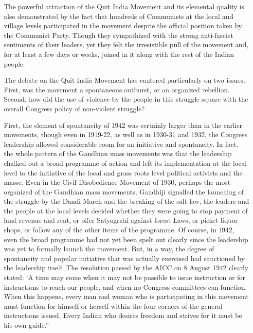 The powerful attraction of the Quit India Movement and its elemental quality is also demonstrated by the fact that hundreds of Communists at the local and village levels participated in the movement despite the official position taken by the Communist Party. Though they sympathized with the strong anti-fascist sentiments of their leaders, yet they felt the irresistible pull of the movement and, for at least a few days or weeks, joined in it along with the rest of the Indian people.

The debate on the Quit India Movement has cantered particularly on two issues. First, was the movement a spontaneous outburst, or an organized rebellion. Second, how did the use of violence by the people in this struggle square with the overall Congress policy of non-violent struggle?

First, the element of spontaneity of 1942 was certainly larger than in the earlier movements, though even in 1919-22, as well as in 1930-31 and 1932, the Congress leadership allowed considerable room for an initiative and spontaneity. In fact, the whole pattern of the Gandhian mass movements was that the leadership chalked out a broad programme of action and left its implementation at the local level to the initiative of the local and grass roots level political activists and the masse. Even in the Civil Disobedience Movement of 1930, perhaps the most organized of the Gandhian mass movements, Gandhiji signalled the launching of the struggle by the Dandi March and the breaking of the salt law, the leaders and the people at the local levels decided whether they were going to stop payment of land revenue and rent, or offer Satyagrahi against forest Laws, or picket liquor shops, or follow any of the other items of the programme. Of course, in 1942, even the broad programme had not yet been spelt out clearly since the leadership was yet to formally launch the movement. But, in a way, the degree of spontaneity and popular initiative that was actually exercised had sanctioned by the leadership itself. The resolution passed by the AICC on 8 August 1942 clearly stated: ‘A time may come when it may not be possible to issue instruction or for instructions to reach our people, and when no Congress committees can function. When this happens, every man and woman who is participating in this movement must function for himself or herself within the four corners of the general instructions issued. Every Indian who desires freedom and strives for it must be his own guide.”

